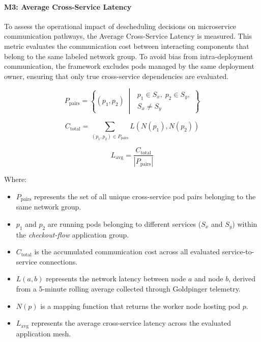 \paragraph{M3: Average Cross-Service Latency}
\label{subsubsec:netaware4_evaluationmetrics3}
To assess the operational impact of descheduling decisions on microservice communication pathways, the Average Cross-Service Latency is measured. This metric evaluates the communication cost between interacting components that belong to the same labeled network group. To avoid bias from intra-deployment communication, the framework excludes pods managed by the same deployment owner, ensuring that only true cross-service dependencies are evaluated.

\[
P_{\text{pairs}}
=
\left\{
(p_1, p_2)
\;\middle|\;
\begin{array}{l}
p_1 \in S_x,\; p_2 \in S_y,\\
S_x \neq S_y
\end{array}
\right\}
\]

\[
C_{\text{total}}
=
\sum_{(p_1, p_2) \in P_{\text{pairs}}}
L\left(
N(p_1),
N(p_2)
\right)
\]

\[
L_{\text{avg}}
=
\frac{C_{\text{total}}}
{|P_{\text{pairs}}|}
\]

Where:

\begin{itemize}
    \item \(P_{\text{pairs}}\) represents the set of all unique cross-service pod pairs belonging to the same network group.

    \item \(p_1\) and \(p_2\) are running pods belonging to different services (\(S_x\) and \(S_y\)) within the \textit{checkout-flow} application group.

    \item \(C_{\text{total}}\) is the accumulated communication cost across all evaluated service-to-service connections.

    \item \(L(a,b)\) represents the network latency between node \(a\) and node \(b\), derived from a 5-minute rolling average collected through Goldpinger telemetry.

    \item \(N(p)\) is a mapping function that returns the worker node hosting pod \(p\).

    \item \(L_{\text{avg}}\) represents the average cross-service latency across the evaluated application mesh.
\end{itemize}

